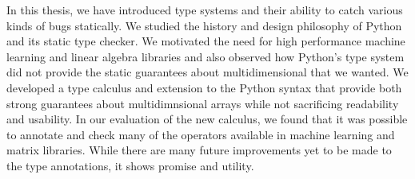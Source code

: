 \documentclass{report}
\begin{document}
In this thesis, we have introduced type systems and their ability to catch various kinds of bugs statically. We studied the history and design philosophy of Python and its static type checker. We motivated the need for high performance machine learning and linear algebra libraries and also observed how Python's type system did not provide the static guarantees about multidimensional that we wanted. We developed a type calculus and extension to the Python syntax that provide both strong guarantees about multidimnsional arrays while not sacrificing readability and usability. In our evaluation of the new calculus, we found that it was possible to annotate and check many of the operators available in machine learning and matrix libraries. While there are many future improvements yet to be made to the type annotations, it shows promise and utility.



\end{document}
